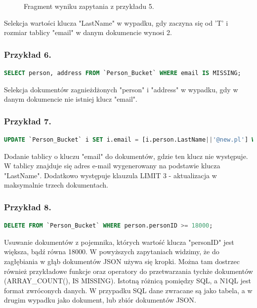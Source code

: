 \documentclass[a4paper,12pt,table]{article}
\begin{document}
{\begin{figure}[h]
\begin{center}
\end{center}
\caption{Fragment wyniku zapytania z przykładu 5.}
\end{figure}\vspace{0.2cm}

Selekcja wartości klucza "LastName" w wypadku, gdy zaczyna się od 'T' i rozmiar tablicy "email" w danym dokumencie wynosi 2.
\subsubsection*{Przykład 6.}
\begin{lstlisting}[language=SQL,basicstyle=\footnotesize]
SELECT person, address FROM `Person_Bucket` WHERE email IS MISSING;
\end{lstlisting}
\vspace{0.5cm}
Selekcja dokumentów zagnieżdżonych "person" i "address" w wypadku, gdy w danym dokumencie nie istniej klucz "email".
\subsubsection*{Przykład 7.}
\begin{lstlisting}[language=SQL,basicstyle=\footnotesize]
UPDATE `Person_Bucket` i SET i.email = [i.person.LastName||'@new.pl'] WHERE email IS MISSING LIMIT 3 RETURNING i;
\end{lstlisting}
\vspace{0.5cm}
Dodanie tablicy o kluczu "email" do dokumentów, gdzie ten klucz nie występuje. W tablicy znajduje się adres e-mail wygenerowany na podstawie klucza "LastName". Dodatkowo występuje klauzula LIMIT 3 - aktualizacja w maksymalnie trzech dokumentach.
\subsubsection*{Przykład 8.}
\begin{lstlisting}[language=SQL,basicstyle=\footnotesize]
DELETE FROM `Person_Bucket` WHERE person.personID >= 18000;
\end{lstlisting}
\vspace{0.5cm}
Usuwanie dokumentów z pojemnika, których wartość klucza "personID" jest większa, bądź równa 18000.
\newpage
W powyższych zapytaniach widzimy, że do zagłębiania w głąb dokumentów JSON używa się kropki. Można tam dostrzec również przykładowe funkcje oraz operatory do przetwarzania tychże dokumentów (ARRAY\_COUNT(), IS MISSING). Istotną różnicą pomiędzy SQL, a N1QL jest format zwróconych danych. W przypadku SQL dane zwracane są jako tabela, a w drugim wypadku jako dokument, lub zbiór dokumentów JSON.




}
\end{document}
